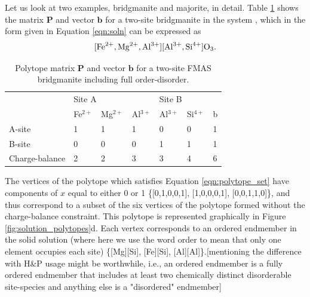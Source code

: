 \documentclass[preprint,12pt]{elsarticle}
\begin{document}
Let us look at two examples, bridgmanite and majorite, in detail. Table \ref{tab:bdg_polytope} shows the matrix $\boldsymbol{P}$ and vector $\boldsymbol{b}$ for a two-site bridgmanite in the system , which in the form given in Equation \ref{eqn:soln} can be expressed as 
\begin{equation*}
\ce{[Fe^{2+}, Mg^{2+}, Al^{3+}][Al^{3+}, Si^{4+}]O3}.
\end{equation*}

\begin{table}[htb!]
\centering
\begin{tabular}{llllll|l}
               & \multicolumn{3}{l}{Site A}      & \multicolumn{2}{l}{Site B} &   \\
               & Fe$^{2+}$ & Mg$^{2+}$ & Al$^{3+}$ & Al$^{3+}$ & Si$^{4+}$ & b \\
               \hline
A-site         & 1    & 1    & 1    & 0    & 0    & 1 \\
B-site         & 0    & 0    & 0    & 1    & 1    & 1 \\
Charge-balance & 2    & 2    & 3    & 3    & 4    & 6
\end{tabular}
\caption{Polytope matrix $\boldsymbol{P}$ and vector $\boldsymbol{b}$ for a two-site FMAS bridgmanite including full order-disorder.}
\label{tab:bdg_polytope}
\end{table}

The vertices of the polytope which satisfies Equation \ref{eqn:polytope_set} have components of $x$ equal to either 0 or 1 \{[0,1,0,0,1], [1,0,0,0,1], [0,0,1,1,0]\}, and thus correspond to a subset of the six vertices of the polytope formed without the charge-balance constraint. This polytope is represented graphically in Figure \ref{fig:solution_polytopes}d. Each vertex corresponds to an ordered endmember in the solid solution (where here we use the word order to mean that only one element occupies each site) \{[Mg][Si], [Fe][Si], [Al][Al]\}.[mentioning the difference with H&P usage might be worthwhile, i.e., an ordered endmember is a fully ordered endmember that includes at least two chemically distinct disorderable site-species and anything else is a "disordered" endmember]
\end{document}
